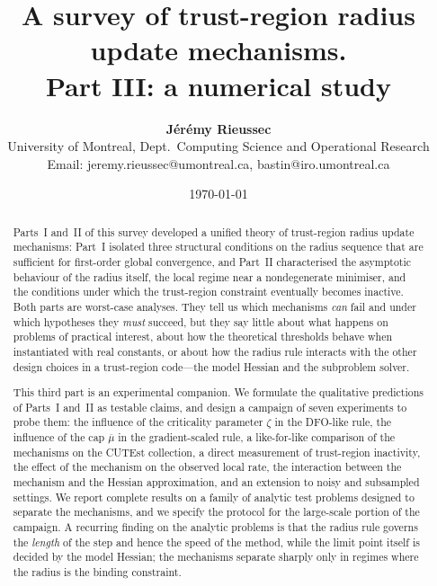 \documentclass[11pt]{article}
\title{{\bf A survey of trust-region radius update mechanisms.\\
        Part III: a numerical study}}
\author{{\bf J\'{e}r\'{e}my Rieussec} \quad {\bf Fabian Bastin}\\
        University of Montreal, Dept.\ Computing Science and Operational Research\\
        Email: jeremy.rieussec@umontreal.ca, bastin@iro.umontreal.ca}
\date{\today}
\theoremstyle{plain}
\theoremstyle{definition}
\theoremstyle{remark}
\numberwithin{equation}{section}
\begin{document}
\maketitle

\begin{abstract}
Parts~I and~II of this survey developed a unified theory of trust-region radius update
mechanisms: Part~I isolated three structural conditions on the radius sequence that are
sufficient for first-order global convergence, and Part~II characterised the asymptotic
behaviour of the radius itself, the local regime near a nondegenerate minimiser, and the
conditions under which the trust-region constraint eventually becomes inactive. Both parts
are worst-case analyses. They tell us which mechanisms \emph{can} fail and under which
hypotheses they \emph{must} succeed, but they say little about what happens on problems of
practical interest, about how the theoretical thresholds behave when instantiated with real
constants, or about how the radius rule interacts with the other design choices in a
trust-region code---the model Hessian and the subproblem solver.

This third part is an experimental companion. We formulate the qualitative predictions of
Parts~I and~II as testable claims, and design a campaign of seven experiments to probe them:
the influence of the criticality parameter $\zeta$ in the DFO-like rule, the influence of the
cap $\overline{\mu}$ in the gradient-scaled rule, a like-for-like comparison of the mechanisms
on the CUTEst collection, a direct measurement of trust-region inactivity, the effect of the
mechanism on the observed local rate, the interaction between the mechanism and the Hessian
approximation, and an extension to noisy and subsampled settings. We report complete results
on a family of analytic test problems designed to separate the mechanisms, and we specify the
protocol for the large-scale portion of the campaign. A recurring finding on the analytic
problems is that the radius rule governs the \emph{length} of the step and hence the speed of
the method, while the limit point itself is decided by the model Hessian; the mechanisms
separate sharply only in regimes where the radius is the binding constraint.
\end{abstract}

\tableofcontents
\end{document}
